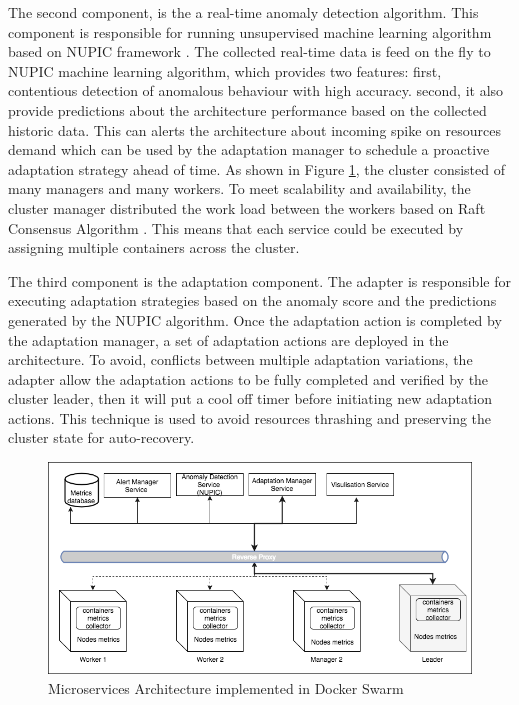 \documentclass[sigconf]{acmart}
\begin{document}
The second component, is the a real-time anomaly detection algorithm. This component is responsible for running unsupervised machine learning algorithm based on NUPIC framework \cite{AHMAD2017134}. The collected real-time data is feed on the fly to NUPIC machine learning algorithm, which provides two features: first, contentious detection of anomalous behaviour with high accuracy. second, it also provide predictions about the architecture performance based on the collected historic data. This can alerts the architecture about incoming spike on resources demand which can be used by the adaptation manager to schedule a proactive adaptation strategy ahead of time. As shown in Figure \ref{fig_model}, the cluster consisted of many managers and many workers. To meet scalability and availability, the cluster manager distributed the work load between the workers based on Raft Consensus Algorithm \cite{ongaro2015raft}. This means that each  service could be executed by assigning multiple containers across the cluster.   


The third component is the adaptation component. The adapter is responsible for executing adaptation strategies based on the anomaly score and the predictions generated by the NUPIC algorithm. Once the adaptation action is completed by the adaptation manager, a set of adaptation actions are deployed in the architecture. To avoid, conflicts between multiple adaptation variations, the adapter allow the adaptation actions to be fully completed and verified by the cluster leader, then it will put a cool off timer before initiating new adaptation actions. This technique is used to avoid resources thrashing and preserving the cluster state for auto-recovery.

\begin{figure}[ht!] 
\includegraphics[scale=0.4]{design}
\caption{Microservices Architecture implemented in Docker Swarm}
\label{fig_model}
\end{figure}
\end{document}
